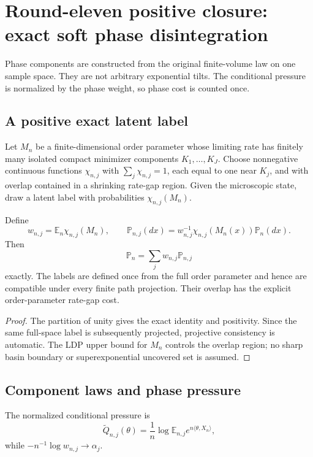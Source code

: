 \section{Round-eleven positive closure: exact soft phase disintegration}
\label{sec:r11-d1}

Phase components are constructed from the original finite-volume law on one
sample space.  They are not arbitrary exponential tilts.  The conditional
pressure is normalized by the phase weight, so phase cost is counted once.

\subsection{A positive exact latent label}
Let $M_n$ be a finite-dimensional order parameter whose limiting rate has
finitely many isolated compact minimizer components $K_1,\ldots,K_J$.
Choose nonnegative continuous functions $\chi_{n,j}$ with
$\sum_j\chi_{n,j}=1$, each equal to one near $K_j$, and with overlap
contained in a shrinking rate-gap region.  Given the microscopic state, draw a
latent label with probabilities $\chi_{n,j}(M_n)$.

\begin{theorem}
\label{thm:r11-d1-disintegration}
Define
\[
 w_{n,j}=\mathbb E_n\chi_{n,j}(M_n),
 \qquad
 \mathbb P_{n,j}(dx)=w_{n,j}^{-1}\chi_{n,j}(M_n(x))\mathbb P_n(dx).
\]
Then
\[
 \mathbb P_n=\sum_jw_{n,j}\mathbb P_{n,j}
\]
exactly.  The labels are defined once from the full order parameter and hence
are compatible under every finite path projection.  Their overlap has the
explicit order-parameter rate-gap cost.
\end{theorem}

\begin{proof}
The partition of unity gives the exact identity and positivity.  Since the
same full-space label is subsequently projected, projective consistency is
automatic.  The LDP upper bound for $M_n$ controls the overlap region; no
sharp basin boundary or superexponential uncovered set is assumed.
\end{proof}

\subsection{Component laws and phase pressure}
The normalized conditional pressure is
\[
 \widetilde Q_{n,j}(\theta)=
 \frac1n\log\mathbb E_{n,j}e^{n\langle\theta,X_n\rangle},
\]
while $-n^{-1}\log w_{n,j}\to\alpha_j$.

